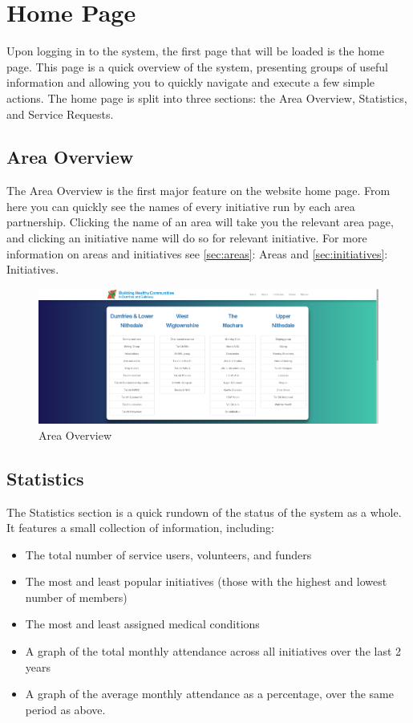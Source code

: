 \documentclass{bhcguides}
\begin{document}
\section{Home Page}
\label{sec:homepage}

Upon logging in to the system, the first page that will be loaded is the home page. This page is a quick overview of the system, presenting groups of useful information and allowing you to quickly navigate and execute a few simple actions. The home page is split into three sections: the Area Overview, Statistics, and Service Requests.

\subsection{Area Overview}
\label{ssec:areaoverview}

The Area Overview is the first major feature on the website home page. From here you can quickly see the names of every initiative run by each area partnership. Clicking the name of an area will take you the relevant area page, and clicking an initiative name will do so for relevant initiative. For more information on areas and initiatives see \autoref{sec:areas}: Areas and \autoref{sec:initiatives}: Initiatives.

\begin{figure}[h!]
 \centerline{\includegraphics[width=\textwidth, height=\textheight, keepaspectratio]{homepage1.png}}
 \caption{Area Overview}
 \label{fig:homePage1}
\end{figure}

\subsection{Statistics}
\label{ssec:statistics}

The Statistics section is a quick rundown of the status of the system as a whole. It features a small collection of information, including:

\begin{itemize}
	\item The total number of service users, volunteers, and funders
	\item The most and least popular initiatives (those with the highest and lowest number of members)
	\item The most and least assigned medical conditions
	\item A graph of the total monthly attendance across all initiatives over the last 2 years
	\item A graph of the average monthly attendance as a percentage, over the same period as above.
\end{itemize}
\end{document}
